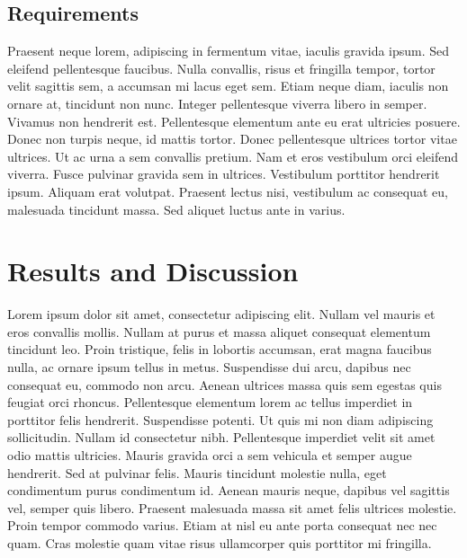 \documentclass[10pt]{bmc_article}
\newenvironment{bmcformat}{\begin{raggedright}\baselineskip20pt\sloppy\setboolean{publ}{false}}{\end{raggedright}\baselineskip20pt\sloppy}
\begin{document}
\begin{bmcformat}
\subsection*{Requirements}

Praesent neque lorem, adipiscing in fermentum vitae, iaculis gravida ipsum. Sed eleifend pellentesque faucibus. Nulla convallis, risus et fringilla tempor, tortor velit sagittis sem, a accumsan mi lacus eget sem. Etiam neque diam, iaculis non ornare at, tincidunt non nunc. Integer pellentesque viverra libero in semper. Vivamus non hendrerit est. Pellentesque elementum ante eu erat ultricies posuere. Donec non turpis neque, id mattis tortor. Donec pellentesque ultrices tortor vitae ultrices. Ut ac urna a sem convallis pretium. Nam et eros vestibulum orci eleifend viverra. Fusce pulvinar gravida sem in ultrices. Vestibulum porttitor hendrerit ipsum. Aliquam erat volutpat. Praesent lectus nisi, vestibulum ac consequat eu, malesuada tincidunt massa. Sed aliquet luctus ante in varius.

\section*{Results and Discussion}

Lorem ipsum dolor sit amet, consectetur adipiscing elit. Nullam vel mauris et eros convallis mollis. Nullam at purus et massa aliquet consequat elementum tincidunt leo. Proin tristique, felis in lobortis accumsan, erat magna faucibus nulla, ac ornare ipsum tellus in metus. Suspendisse dui arcu, dapibus nec consequat eu, commodo non arcu. Aenean ultrices massa quis sem egestas quis feugiat orci rhoncus. Pellentesque elementum lorem ac tellus imperdiet in porttitor felis hendrerit. Suspendisse potenti. Ut quis mi non diam adipiscing sollicitudin. Nullam id consectetur nibh. Pellentesque imperdiet velit sit amet odio mattis ultricies. Mauris gravida orci a sem vehicula et semper augue hendrerit. Sed at pulvinar felis. Mauris tincidunt molestie nulla, eget condimentum purus condimentum id. Aenean mauris neque, dapibus vel sagittis vel, semper quis libero. Praesent malesuada massa sit amet felis ultrices molestie. Proin tempor commodo varius. Etiam at nisl eu ante porta consequat nec nec quam. Cras molestie quam vitae risus ullamcorper quis porttitor mi fringilla.


\end{bmcformat}
\end{document}
